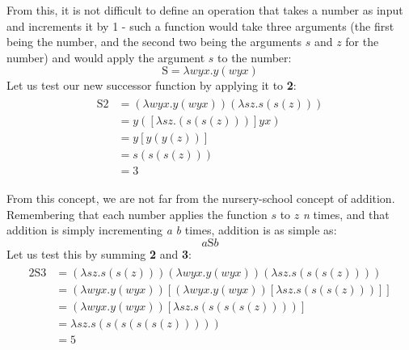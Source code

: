 \documentclass[Master.tex]{subfiles}
\begin{document}
From this, it is not difficult to define an operation that takes a number as input and increments it by 1 - such a function would take three arguments (the first being the number, and the second two being the arguments $s$ and $z$ for the number) and would apply the argument $s$ to the number:
\begin{equation*}
\bm{\mathrm{S}} = \lambda wyx.y(wyx)
\end{equation*}
Let us test our new successor function by applying it to \textbf{2}:
\begin{gather*}
\begin{aligned}
\bm{\mathrm{S2}} &= (\lambda wyx.y(wyx)) (\lambda sz.s(s(z)))\\
&= y([\lambda sz.(s(s(z)))]yx)\\
&=y[y(y(z))]\\
&=s(s(s(z)))\\
&=\bm{\mathrm{3}}
\end{aligned}
\end{gather*}

From this concept, we are not far from the nursery-school concept of addition. Remembering that each number applies the function $s$ to $z$ \textit{n} times, and that addition is simply incrementing \textit{a} \textit{b} times, addition is as simple as:
\begin{equation*}
a\bm{\mathrm{S}}b	
\end{equation*}
Let us test this by summing \textbf{2} and \textbf{3}:
\begin{gather*}
\begin{aligned}
\bm{\mathrm{2S3}} &= (\lambda sz.s(s(z))) (\lambda wyx.y(wyx)) (\lambda sz.s(s(s(z))))\\
&= (\lambda wyx.y(wyx)) [(\lambda wyx.y(wyx)) [\lambda sz.s(s(s(z)))]]\\
&= (\lambda wyx.y(wyx)) [\lambda sz.s(s(s(s(z))))]\\
&= \lambda sz.s(s(s(s(s(z)))))\\
&= \bm{\mathrm{5}}
\end{aligned}
\end{gather*}
\end{document}
